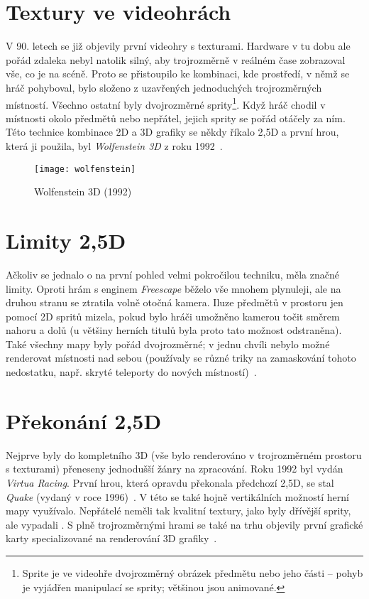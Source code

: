 \documentclass[a4paper, 11pt]{report}
\begin{document}
\begin{chapterwithoutpagebreak}
\section{Textury ve videohrách}
V 90. letech se již objevily první videohry s texturami. Hardware v tu dobu ale pořád zdaleka nebyl natolik silný, aby trojrozměrně v reálném čase zobrazoval vše, co je na scéně. Proto se přistoupilo ke kombinaci, kde prostředí, v němž se hráč pohyboval, bylo složeno z uzavřených jednoduchých trojrozměrných místností. Všechno ostatní byly dvojrozměrné sprity\footnote{Sprite je ve videohře dvojrozměrný obrázek předmětu nebo jeho části -- pohyb je vyjádřen manipulací se sprity; většinou jsou animované.}. Když hráč chodil v místnosti okolo předmětů nebo nepřátel, jejich sprity se pořád otáčely za ním. Této technice kombinace 2D a 3D grafiky se někdy říkalo 2,5D a první hrou, která ji použila, byl \emph{Wolfenstein 3D} z roku 1992~\cite{techradar:evolution}.

\begin{figure}[h]
    \centering
    \texttt{[image: wolfenstein]}
    \caption[Wolfenstein 3D (1992)]{Wolfenstein 3D (1992)~\cite{pic:wolfenstein}}
\end{figure}

\section{Limity 2,5D}
Ačkoliv se jednalo o na první pohled velmi pokročilou techniku, měla značné limity. Oproti hrám s enginem \emph{Freescape} běželo vše mnohem plynuleji, ale na druhou stranu se ztratila volně otočná kamera. Iluze předmětů v prostoru jen pomocí 2D spritů mizela, pokud bylo hráči umožněno kamerou točit směrem nahoru a dolů (u většiny herních titulů byla proto tato možnost odstraněna). Také všechny mapy byly pořád dvojrozměrné; v jednu chvíli nebylo možné renderovat místnosti nad sebou (používaly se různé triky na zamaskování tohoto nedostatku, např. skryté teleporty do nových místností)~\cite{techradar:evolution}.

\section{Překonání 2,5D}
Nejprve byly do kompletního 3D (vše bylo renderováno v trojrozměrném prostoru s texturami) přeneseny jednodušší žánry na zpracování. Roku 1992 byl vydán \emph{Virtua Racing}. První hrou, která opravdu překonala předchozí 2,5D, se stal \emph{Quake} (vydaný v roce 1996)~\cite{pcmag:history}. V této  se také hojně vertikálních možností herní mapy využívalo. Nepřátelé neměli tak kvalitní textury, jako byly dřívější sprity, ale vypadali . S plně trojrozměrnými hrami se také na trhu objevily první grafické karty specializované na renderování 3D grafiky~\cite{newegg:gpu}.


\end{chapterwithoutpagebreak}
\end{document}
